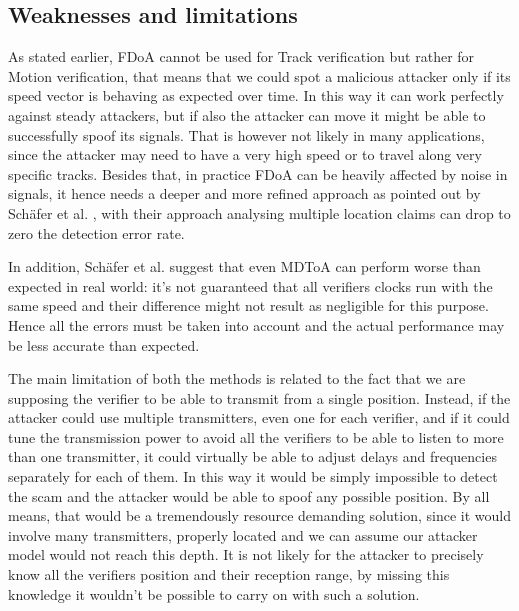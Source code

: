 \subsection{Weaknesses and limitations} \label{gm_sec_cons}
As stated earlier, FDoA cannot be used for Track verification but rather for Motion verification, that means that we could spot a malicious attacker only if its speed vector is behaving as expected over time. In this way it can work perfectly against steady attackers, but if also the attacker can move it might be able to successfully spoof its signals. That is however not likely in many applications, since the attacker may need to have a very high speed or to travel along very specific tracks. Besides that, in practice FDoA can be heavily affected by noise in signals, it hence needs a deeper and more refined approach as pointed out by Schäfer et al. \cite{schaefer16}, with their approach analysing multiple location claims can drop to zero the detection error rate.

In addition, Schäfer et al. \cite{schaefer15} suggest that even MDToA can perform worse than expected in real world: it's not guaranteed that all verifiers clocks run with the same speed and their difference might not result as negligible for this purpose. Hence all the errors must be taken into account and the actual performance may be less accurate than expected.

The main limitation of both the methods is related to the fact that we are supposing the verifier to be able to transmit from a single position. Instead, if the attacker could use multiple transmitters, even one for each verifier, and if it could tune the transmission power to avoid all the verifiers to be able to listen to more than one transmitter, it could virtually be able to adjust delays and frequencies separately for each of them. In this way it would be simply impossible to detect the scam and the attacker would be able to spoof any possible position. By all means, that would be a tremendously resource demanding solution, since it would involve many transmitters, properly located and we can assume our attacker model would not reach this depth. It is not likely for the attacker to precisely know all the verifiers position and their reception range, by missing this knowledge it wouldn't be possible to carry on with such a solution.

